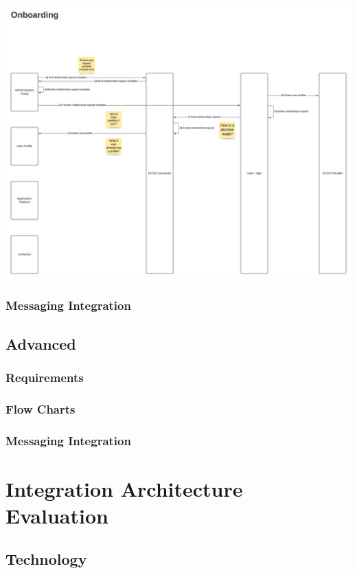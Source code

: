 \documentclass[
     12pt,         %
     a4paper,      %
     BCOR=10mm,version=first,     %
     DIV=14,version=first,        %
     ]{scrreprt}
\begin{document}
\includegraphics[width=\textwidth]{Basic Integration Onboarding.png}

\subsection{Messaging Integration}

\section{Advanced}

\subsection{Requirements}

\subsection{Flow Charts}

\subsection{Messaging Integration}


\chapter{Integration Architecture Evaluation}

\section{Technology}
\end{document}
